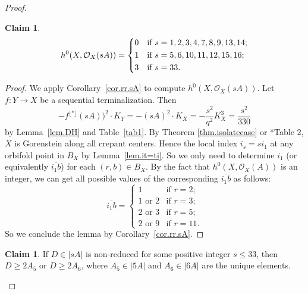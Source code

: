 \documentclass[12pt,twoside]{amsart}
\theoremstyle{definition}
\newtheorem{claim}[thm]{Claim}
\begin{document}
\begin{proof}
    \begin{claim}\label{claim.rrfor<=33}
        \begin{equation*}
            h^0(X, \mathcal O_X(sA))=
            \begin{dcases}
            0 & \text{if } s=1,2,3,4,7,8,9,13,14; \\ %
            1 & \text{if } s=5,6,10,11,12,15,16; \\ %
            3& \text{if } s=33.
            \end{dcases}
        \end{equation*}
    \end{claim}
    \begin{proof}
        We apply Corollary~\ref{cor.rr.sA} to compute $h^0(X, \mathcal O_X(sA))$. Let $f\colon Y\to X$ be a sequential terminalization. Then 
        \[
            -f^{\lfloor *\rfloor}(sA))^2\cdot K_Y=-(sA)^2\cdot K_X=-\frac{s^2}{q^2}K_X^3=\frac{s^2}{330}
        \] 
        by Lemma~\ref{lem.DH} and Table~\ref{tab1}. By Theorem \ref{thm.isolatecase} or \cite{kawakita}*{Table 2}, $X$ is Gorenstein along all crepant centers. Hence the local index $i_s=si_1$ at any orbifold point in $B_X$ by Lemma~\ref{lem.it=ti}. So we only need to determine $i_1$ (or equivalently $\overline{i_1b}$) for each $(r,b)\in B_X$. By the fact that $h^0(X, \mathcal{O}_X(A))$ is an integer, we can get all possible values of the corresponding $\overline{i_1b}$ as follows:
        \[
            \overline{i_1b}=\begin{cases}
            1 & \text{if } r=2;\\
            1 \text{ or } 2 & \text{if } r=3;\\
            2 \text{ or } 3 & \text{if } r=5;\\
            2 \text{ or } 9 & \text{if } r=11.
            \end{cases}
        \]
        So we conclude the lemma by Corollary~\ref{cor.rr.sA}.
    \end{proof}

    \begin{claim}\label{claim.easyfact}
        If $D\in |sA|$ is non-reduced for some positive integer $s\leq 33$, then $D\geq 2A_5$ or $D\geq 2A_6$, where $A_5\in|5A|$ and $A_6\in|6A|$ are the unique elements.
    \end{claim}


\end{proof}
\end{document}

